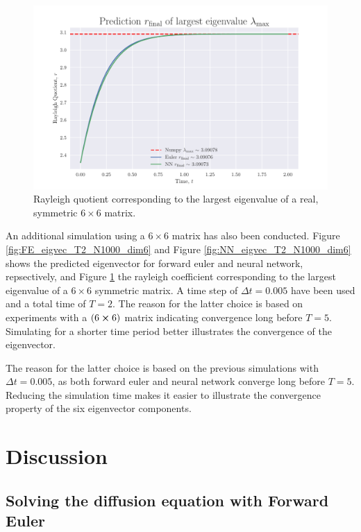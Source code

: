 \documentclass[12pt]{extarticle}
\begin{document}
\begin{figure}[h]
	\centering
	\includegraphics[scale=0.6]{../output/plots/eigval_T2_N1000_dim6.pdf}
	\caption{Rayleigh quotient corresponding to the largest eigenvalue of a real, symmetric $6\times 6$ matrix.}
	\label{fig:eigval_T2_N1000_dim6}
\end{figure}

An additional simulation using a $6\times 6$ matrix has also been conducted. Figure \ref{fig:FE_eigvec_T2_N1000_dim6} and Figure \ref{fig:NN_eigvec_T2_N1000_dim6} shows the predicted eigenvector for forward euler and neural network, repsectively, and Figure \ref{fig:eigval_T2_N1000_dim6} the rayleigh coefficient corresponding to the largest eigenvalue of a $6\times 6$ symmetric matrix. A time step of $\Delta t = 0.005$ have been used and a total time of $T=2$. The reason for the latter choice is based on experiments with a $(6 \cross 6)$ matrix indicating convergence long before $T=5$. Simulating for a shorter time period better illustrates the convergence of the eigenvector.

The reason for the latter choice is based on the previous simulations with $\Delta t=0.005$, as both forward euler and neural network converge long before $T=5$. Reducing the simulation time makes it easier to illustrate the convergence property of the six eigenvector components.
 
 
\clearpage
\section{Discussion}

\subsection{Solving the diffusion equation with Forward Euler}
\end{document}
